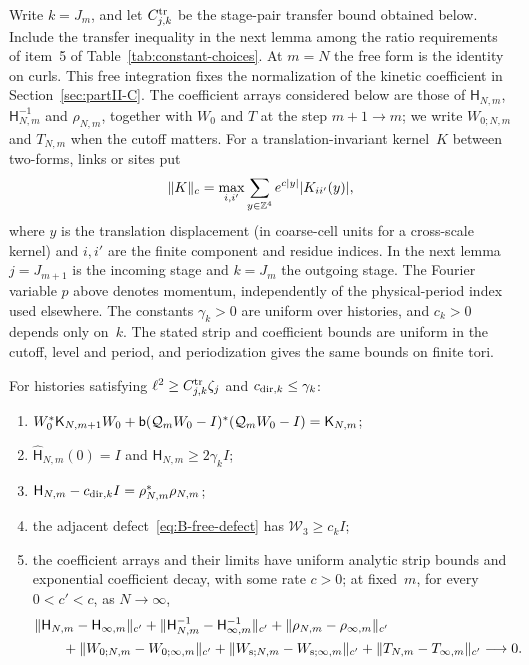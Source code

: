 Write $k=J_m$, and let $C^{\rm tr}_{j,k}$ be the stage-pair transfer bound obtained below. Include the transfer inequality in the next lemma among the ratio requirements of item~5 of Table~\ref{tab:constant-choices}. At $m=N$ the free form is the identity on curls. This free integration fixes the normalization of the kinetic coefficient in Section~\ref{sec:partII-C}. The coefficient arrays considered below are those of $\mathsf H_{N,m}$, $\mathsf H_{N,m}^{-1}$ and $\rho_{N,m}$, together with $W_0$ and $T$ at the step $m+1\to m$; we write $W_{0;N,m}$ and $T_{N,m}$ when the cutoff matters. For a translation-invariant kernel~$K$ between two-forms, links or sites put
\begin{equation*}
\|K\|_c=\max_{i,i'}\sum_{y\in\mathbb{Z}^4}e^{c|y|}|K_{ii'}(y)|,
\end{equation*}
where $y$ is the translation displacement (in coarse-cell units for a cross-scale kernel) and $i,i'$ are the finite component and residue indices. In the next lemma $j=J_{m+1}$ is the incoming stage and $k=J_m$ the outgoing stage. The Fourier variable $p$ above denotes momentum, independently of the physical-period index used elsewhere. The constants $\gamma_k>0$ are uniform over histories, and $c_k>0$ depends only on~$k$. The stated strip and coefficient bounds are uniform in the cutoff, level and period, and periodization gives the same bounds on finite tori.
\begin{lemma}\label{lem:B2}
For histories satisfying $\ell^2\ge C^{\rm tr}_{j,k}\zeta_j$ and $c_{{\rm dir},k}\le\gamma_k$:
\begin{enumerate}[label=(\roman*)]
\item $W_0^*\mathsf K_{N,m+1}W_0+\mathsf{b}(\mathcal Q_mW_0-I)^*(\mathcal Q_mW_0-I)=\mathsf K_{N,m}$;
\item $\widehat{\mathsf H}_{N,m}(0)=I$ and $\mathsf H_{N,m}\ge2\gamma_{k}I$;
\item $\mathsf H_{N,m}-c_{{\rm dir},k}I=\rho_{N,m}^*\rho_{N,m}$;
\item the adjacent defect~\eqref{eq:B-free-defect} has $\mathcal W_3\ge c_kI$;
\item the coefficient arrays and their limits have uniform analytic strip bounds and exponential coefficient decay, with some rate $c>0$; at fixed~$m$, for every $0<c'<c$, as $N\to\infty$,
\begin{equation}\label{eq:B-free-limit}
\begin{aligned}
&\|\mathsf H_{N,m}-\mathsf H_{\infty,m}\|_{c'}
+\|\mathsf H_{N,m}^{-1}-\mathsf H_{\infty,m}^{-1}\|_{c'}
+\|\rho_{N,m}-\rho_{\infty,m}\|_{c'}\\
&\qquad+\|W_{0;N,m}-W_{0;\infty,m}\|_{c'}
+\|W_{{\rm s};N,m}-W_{{\rm s};\infty,m}\|_{c'}
+\|T_{N,m}-T_{\infty,m}\|_{c'}\longrightarrow0.
\end{aligned}
\end{equation}
\end{enumerate}
\end{lemma}
